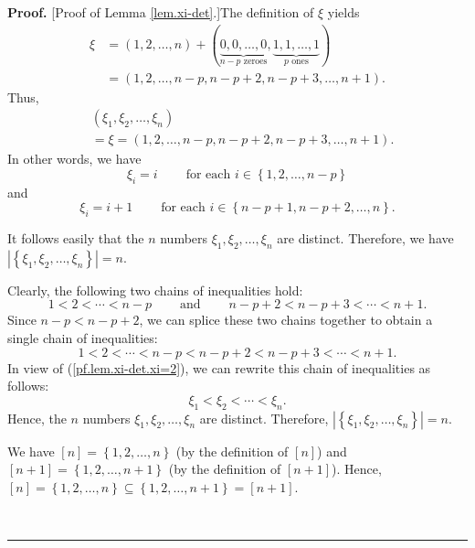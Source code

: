 \documentclass[numbers=enddot,12pt,final,onecolumn,notitlepage,english]{scrartcl}%
\theoremstyle{definition}
\newenvironment{proof}[1][Proof]{\noindent\textbf{#1.} }{\ \rule{0.5em}{0.5em}}
\newenvironment{verlong}{}{}
\newenvironment{vershort}{}{}
\begin{document}
\begin{proof}
[Proof of Lemma \ref{lem.xi-det}.]The definition of $\xi$ yields%
\begin{align*}
\xi &  =\left(  1,2,\ldots,n\right)  +\left(  \underbrace{0,0,\ldots
,0}_{n-p\text{ zeroes}},\underbrace{1,1,\ldots,1}_{p\text{ ones}}\right) \\
&  =\left(  1,2,\ldots,n-p,n-p+2,n-p+3,\ldots,n+1\right)  .
\end{align*}
Thus,%
\begin{align}
&  \left(  \xi_{1},\xi_{2},\ldots,\xi_{n}\right) \nonumber\\
&  =\xi=\left(  1,2,\ldots,n-p,n-p+2,n-p+3,\ldots,n+1\right)  .
\label{pf.lem.xi-det.xi=2}%
\end{align}
In other words, we have%
\begin{equation}
\xi_{i}=i\ \ \ \ \ \ \ \ \ \ \text{for each }i\in\left\{  1,2,\ldots
,n-p\right\}  \label{pf.lem.xi-det.xii=}%
\end{equation}
and%
\begin{equation}
\xi_{i}=i+1\ \ \ \ \ \ \ \ \ \ \text{for each }i\in\left\{  n-p+1,n-p+2,\ldots
,n\right\}  . \label{pf.lem.xi-det.xin=}%
\end{equation}


\begin{vershort}
\noindent It follows easily that the $n$ numbers $\xi_{1},\xi_{2},\ldots
,\xi_{n}$ are distinct. Therefore, we have $\left\vert \left\{  \xi_{1}%
,\xi_{2},\ldots,\xi_{n}\right\}  \right\vert =n$.
\end{vershort}

\begin{verlong}
Clearly, the following two chains of inequalities hold:%
\[
1<2<\cdots<n-p\ \ \ \ \ \ \ \ \ \ \text{and}%
\ \ \ \ \ \ \ \ \ \ n-p+2<n-p+3<\cdots<n+1.
\]
Since $n-p<n-p+2$, we can splice these two chains together to obtain a single
chain of inequalities:%
\[
1<2<\cdots<n-p<n-p+2<n-p+3<\cdots<n+1.
\]
In view of (\ref{pf.lem.xi-det.xi=2}), we can rewrite this chain of
inequalities as follows:
\[
\xi_{1}<\xi_{2}<\cdots<\xi_{n}.
\]
Hence, the $n$ numbers $\xi_{1},\xi_{2},\ldots,\xi_{n}$ are distinct.
Therefore, $\left\vert \left\{  \xi_{1},\xi_{2},\ldots,\xi_{n}\right\}
\right\vert =n$.
\end{verlong}

\begin{verlong}
We have $\left[  n\right]  =\left\{  1,2,\ldots,n\right\}  $ (by the
definition of $\left[  n\right]  $) and $\left[  n+1\right]  =\left\{
1,2,\ldots,n+1\right\}  $ (by the definition of $\left[  n+1\right]  $).
Hence, $\left[  n\right]  =\left\{  1,2,\ldots,n\right\}  \subseteq\left\{
1,2,\ldots,n+1\right\}  =\left[  n+1\right]  $.\medskip
\end{verlong}


\end{proof}
\end{document}
